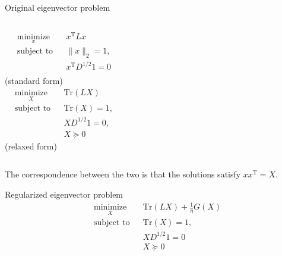 \documentclass[xcolor=dvipsnames]{beamer}
\begin{document}
\begin{frame}
  \begin{block}{Original eigenvector problem}
  \begin{columns}
    \begin{equation*}
    \begin{aligned}
    & \underset{x}{\text{minimize}}
    & & x^\mathrm{T} L x \\
    & \text{subject to}
    & & \| x \|_2 = 1, \\
    & & & x^\mathrm{T} D^{1/2} 1 = 0 \\
    & & &
    \end{aligned}
    \end{equation*}
    (standard form)
    \begin{equation*}
    \begin{aligned}
    & \underset{X}{\text{minimize}}
    & & \mathrm{Tr}(L X)\\
    & \text{subject to}
    & & \mathrm{Tr}(X) = 1, \\
    & & & X D^{1/2} 1 = 0, \\
    & & & X \succeq 0
    \end{aligned}
    \end{equation*}
    (relaxed form)
  \end{columns}
  \end{block}
  The correspondence between the two is that the solutions satisfy
  $x x^\mathrm{T} = X$.
\end{frame}

\begin{frame}
  \begin{block}{Regularized eigenvector problem}
    \begin{equation*}
    \begin{aligned}
    & \underset{X}{\text{minimize}}
    & & \mathrm{Tr}(L X) + \tfrac{1}{\eta} G(X) \\
    & \text{subject to}
    & & \mathrm{Tr}(X) = 1, \\
    & & & X D^{1/2} 1 = 0 \\
    & & & X \succeq 0
    \end{aligned}
    \end{equation*}
  \end{block}
\end{frame}
\end{document}
